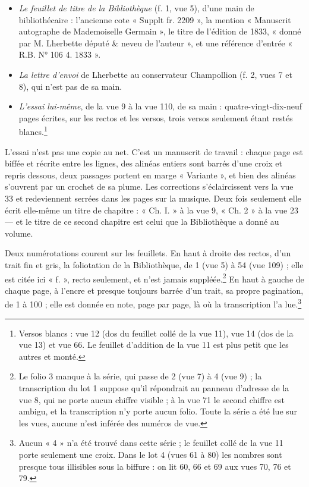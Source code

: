 \documentclass[11pt,a4paper]{article}
\begin{document}
\begin{itemize}
  \item \emph{Le feuillet de titre de la Bibliothèque} (f. 1, vue 5), d'une main
    de bibliothécaire : l'ancienne cote « Supplt fr. 2209 », la mention
    « Manuscrit autographe de Mademoiselle Germain », le titre de l'édition de
    1833, « donné par M. Lherbette député \& neveu de l'auteur », et une
    référence d'entrée « R.B. N° 106 4. 1833 ».
  \item \emph{La lettre d'envoi} de Lherbette au conservateur Champollion
    (f. 2, vues 7 et 8), qui n'est pas de sa main.
  \item \emph{L'essai lui-même}, de la vue 9 à la vue 110, de sa main : quatre-vingt-dix-neuf
    pages écrites, sur les rectos et les versos, trois versos seulement étant
    restés blancs.\footnote{Versos blancs : vue 12 (dos du feuillet collé de
    la vue 11), vue 14 (dos de la vue 13) et vue 66. Le feuillet d'addition de
    la vue 11 est plus petit que les autres et monté.}
\end{itemize}

L'essai n'est pas une copie au net. C'est un manuscrit de travail : chaque
page est biffée et récrite entre les lignes, des alinéas entiers sont barrés
d'une croix et repris dessous, deux passages portent en marge « Variante »,
et bien des alinéas s'ouvrent par un crochet de sa plume. Les corrections
s'éclaircissent vers la vue 33 et redeviennent serrées dans les pages sur la
musique. Deux fois seulement elle écrit elle-même un titre de chapitre :
« Ch. I. » à la vue 9, « Ch. 2 » à la vue 23 — et le titre de ce second
chapitre est celui que la Bibliothèque a donné au volume.

Deux numérotations courent sur les feuillets. En haut à droite des rectos,
d'un trait fin et gris, la foliotation de la Bibliothèque, de 1 (vue 5) à 54
(vue 109) ; elle est citée ici « f. », recto seulement, et n'est jamais
suppléée.\footnote{Le folio 3 manque à la série, qui passe de 2
(vue 7) à 4 (vue 9) ; la transcription du lot 1 suppose qu'il répondrait au
panneau d'adresse de la vue 8, qui ne porte aucun chiffre visible ; à la vue 71 le second chiffre est ambigu, et la
transcription n'y porte aucun folio. Toute la série a été lue sur les vues,
aucune n'est inférée des numéros de vue.} En haut à gauche de chaque page, à
l'encre et presque toujours barrée d'un trait, sa propre pagination, de 1 à
100 ; elle est donnée en note, page par page, là où la transcription l'a
lue.\footnote{Aucun « 4 » n'a été trouvé dans cette série ; le feuillet collé
de la vue 11 porte seulement une croix. Dans le lot 4 (vues 61 à 80) les
nombres sont presque tous illisibles sous la biffure : on lit 60, 66 et 69 aux
vues 70, 76 et 79.}
\end{document}
